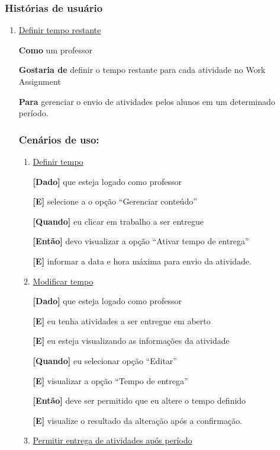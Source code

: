 \subsubsection*{Histórias de usuário}
\begin{enumerate}
\item \underline{Definir tempo restante}

\textbf{Como} um professor

\textbf{Gostaria de} definir o tempo restante para cada atividade no Work Assignment

\textbf{Para} gerenciar o envio de atividades pelos alunos em um determinado período.

\subsubsection*{Cenários de uso:}

\begin{enumerate}
\item \underline{Definir tempo}

\textbf{[Dado]} que esteja logado como professor

\textbf{[E]} selecione a o opção ``Gerenciar conteúdo''

\textbf{[Quando]} eu clicar em trabalho a ser entregue

\textbf{[Então]} devo visualizar a opção ``Ativar tempo de entrega''

\textbf{[E]} informar a data e hora máxima para envio da atividade.

\item \underline{Modificar tempo}

\textbf{[Dado]} que esteja logado como professor

\textbf{[E]} eu tenha atividades a ser entregue em aberto

\textbf{[E]} eu esteja visualizando as informações da atividade

\textbf{[Quando]} eu selecionar opção ``Editar''

\textbf{[E]} visualizar a opção ``Tempo de entrega''

\textbf{[Então]} deve ser permitido que eu altere o tempo definido

\textbf{[E]} visualize o resultado da alteração após a confirmação.

\item \underline{Permitir entrega de atividades após período}


\end{enumerate}
\end{enumerate}
